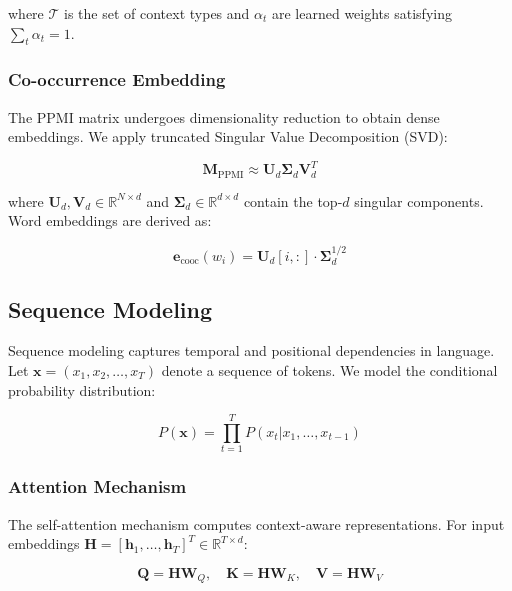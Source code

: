 \documentclass[conference]{IEEEtran}
\begin{document}
where $\mathcal{T}$ is the set of context types and $\alpha_t$ are learned weights satisfying $\sum_t \alpha_t = 1$.

\subsubsection{Co-occurrence Embedding}

The PPMI matrix undergoes dimensionality reduction to obtain dense embeddings. We apply truncated Singular Value Decomposition (SVD):

\begin{equation}
\mathbf{M}_{\text{PPMI}} \approx \mathbf{U}_d \mathbf{\Sigma}_d \mathbf{V}_d^T
\end{equation}

where $\mathbf{U}_d, \mathbf{V}_d \in \mathbb{R}^{N \times d}$ and $\mathbf{\Sigma}_d \in \mathbb{R}^{d \times d}$ contain the top-$d$ singular components. Word embeddings are derived as:

\begin{equation}
\mathbf{e}_{\text{cooc}}(w_i) = \mathbf{U}_d[i,:] \cdot \mathbf{\Sigma}_d^{1/2}
\end{equation}

\subsection{Sequence Modeling}

Sequence modeling captures temporal and positional dependencies in language. Let $\mathbf{x} = (x_1, x_2, \ldots, x_T)$ denote a sequence of tokens. We model the conditional probability distribution:

\begin{equation}
P(\mathbf{x}) = \prod_{t=1}^{T} P(x_t | x_1, \ldots, x_{t-1})
\end{equation}

\subsubsection{Attention Mechanism}

The self-attention mechanism computes context-aware representations. For input embeddings $\mathbf{H} = [\mathbf{h}_1, \ldots, \mathbf{h}_T]^T \in \mathbb{R}^{T \times d}$:

\begin{equation}
\mathbf{Q} = \mathbf{H}\mathbf{W}_Q, \quad \mathbf{K} = \mathbf{H}\mathbf{W}_K, \quad \mathbf{V} = \mathbf{H}\mathbf{W}_V
\end{equation}
\end{document}
